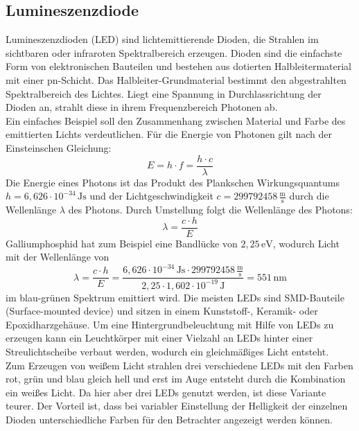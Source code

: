 \subsection{Lumineszenzdiode}
Lumineszenzdioden (LED) sind lichtemittierende Dioden, die Strahlen im sichtbaren oder infraroten Spektralbereich erzeugen. Dioden sind die einfachste Form von elektronischen Bauteilen und bestehen aus dotierten Halbleitermaterial mit einer pn-Schicht. Das Halbleiter-Grundmaterial bestimmt den abgestrahlten Spektralbereich des Lichtes. Liegt eine Spannung in Durchlassrichtung der Dioden an, strahlt diese in ihrem Frequenzbereich Photonen ab. \cite[Vgl. Seite 193 f.]{LofflerMang.2020} \\
Ein einfaches Beispiel soll den Zusammenhang zwischen Material und Farbe des emittierten Lichts verdeutlichen. Für die Energie von Photonen gilt nach der Einstein\grq schen Gleichung:
\begin{equation}
	E = h \cdot f = \frac{h \cdot c}{\lambda}
\end{equation}
Die Energie eines Photons ist das Produkt des Plank\grq schen Wirkungsquantums $ h = 6,626 \cdot 10^{-34}\, \mathrm{Js} $ und der Lichtgeschwindigkeit $ c = 299792458\, \frac{\mathrm{m}}{\mathrm{s}}$ durch die Wellenlänge $ \lambda $ des Photons.
Durch Umstellung folgt die Wellenlänge des Photons:
\begin{equation}
	\lambda = \frac{c \cdot h}{E}
\end{equation}
Galliumphosphid hat zum Beispiel eine Bandlücke von $ 2,25\,\mathrm{eV} $, wodurch Licht mit der Wellenlänge von
\begin{equation}
	\lambda = \frac{c \cdot h}{E} = \frac{6,626 \cdot 10^{-34}\,\mathrm{Js} \cdot 299792458\,\frac{\mathrm{m}}{\mathrm{s}}}{2,25 \cdot 1,602 \cdot 10^{-19}\, \mathrm{J}} = 551\,\mathrm{nm}
\end{equation}
im blau-grünen Spektrum emittiert wird.
Die meisten LEDs sind SMD-Bauteile (Surface-mounted device) und sitzen in einem Kunststoff-, Keramik- oder Epoxidharzgehäuse. 
Um eine Hintergrundbeleuchtung mit Hilfe von LEDs zu erzeugen kann ein Leuchtkörper mit einer Vielzahl an LEDs hinter einer Streulichtscheibe verbaut werden, wodurch ein gleichmäßiges Licht entsteht. \cite[Vgl. Seite 194]{LofflerMang.2020} \\
Zum Erzeugen von weißem Licht strahlen drei verschiedene LEDs mit den Farben rot, grün und blau gleich hell und erst im Auge entsteht durch die Kombination ein weißes Licht. Da hier aber drei LEDs genutzt werden, ist diese Variante teurer. Der Vorteil ist, dass bei variabler Einstellung der Helligkeit der einzelnen Dioden unterschiedliche Farben für den Betrachter angezeigt werden können. \\ 

